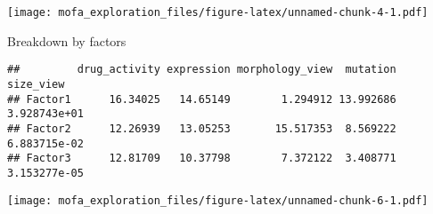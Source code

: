 \documentclass[
]{article}
\newenvironment{Shaded}{\begin{snugshade}}{\end{snugshade}}
\newcommand{\DataTypeTok}[1]{\textcolor[rgb]{0.13,0.29,0.53}{#1}}
\newcommand{\DecValTok}[1]{\textcolor[rgb]{0.00,0.00,0.81}{#1}}
\newcommand{\KeywordTok}[1]{\textcolor[rgb]{0.13,0.29,0.53}{\textbf{#1}}}
\newcommand{\NormalTok}[1]{#1}
\newcommand{\OperatorTok}[1]{\textcolor[rgb]{0.81,0.36,0.00}{\textbf{#1}}}
\newcommand{\StringTok}[1]{\textcolor[rgb]{0.31,0.60,0.02}{#1}}
\begin{document}
\texttt{[image: mofa\_exploration\_files/figure-latex/unnamed-chunk-4-1.pdf]}

Breakdown by factors

\begin{Shaded}
\end{Shaded}

\begin{verbatim}
##         drug_activity expression morphology_view  mutation    size_view
## Factor1      16.34025   14.65149        1.294912 13.992686 3.928743e+01
## Factor2      12.26939   13.05253       15.517353  8.569222 6.883715e-02
## Factor3      12.81709   10.37798        7.372122  3.408771 3.153277e-05
\end{verbatim}

\begin{Shaded}
\end{Shaded}

\texttt{[image: mofa\_exploration\_files/figure-latex/unnamed-chunk-6-1.pdf]}
\end{document}
